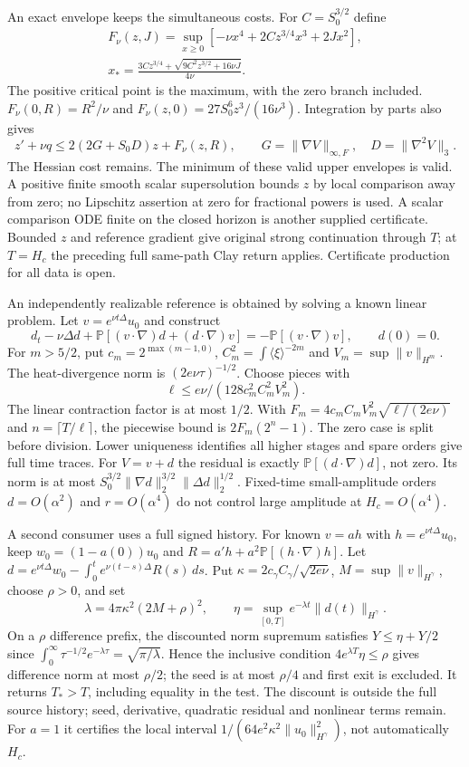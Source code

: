\documentclass[11pt]{article}
\begin{document}
An exact envelope keeps the simultaneous costs. For $C=S_0^{3/2}$ define
\[
 \begin{gathered}
 F_\nu(z,J)=\sup_{x\ge0}[-\nu x^4+2Cz^{3/4}x^3+2Jx^2],\\
 x_* =\frac{3Cz^{3/4}+\sqrt{9C^2z^{3/2}+16\nu J}}{4\nu}.
 \end{gathered}
\]
The positive critical point is the maximum, with the zero branch included.
$F_\nu(0,R)=R^2/\nu$ and
$F_\nu(z,0)=27S_0^6z^3/(16\nu^3)$. Integration by parts also gives
\[
 z'+\nu q\le2(2G+S_0D)z+F_\nu(z,R),\qquad
 G=\|\nabla V\|_{\infty,F},\quad D=\|\nabla^2V\|_3.
\]
The Hessian cost remains. The minimum of these valid upper envelopes is
valid. A positive finite smooth scalar supersolution bounds $z$ by local
comparison away from zero; no Lipschitz assertion at zero for fractional
powers is used. A scalar comparison ODE finite on the closed horizon is
another supplied certificate. Bounded $z$ and reference gradient give
original strong continuation through $T$; at $T=H_c$ the preceding full
same-path Clay return applies. Certificate production for all data is open.

An independently realizable reference is obtained by solving a known
linear problem. Let $v=e^{\nu t\Delta}u_0$ and construct
\[
 d_t-\nu\Delta d+\mathbb P[(v\cdot\nabla)d+(d\cdot\nabla)v]
      =-\mathbb P[(v\cdot\nabla)v],\qquad d(0)=0.
\]
For $m>5/2$, put $c_m=2^{\max(m-1,0)}$,
$C_m^2=\int\langle\xi\rangle^{-2m}$ and
$V_m=\sup\|v\|_{H^m}$. The heat-divergence norm is
$(2e\nu\tau)^{-1/2}$. Choose pieces with
\[
 \ell\le e\nu/(128c_m^2C_m^2V_m^2).
\]
The linear contraction factor is at most $1/2$.
With $F_m=4c_mC_mV_m^2\sqrt{\ell/(2e\nu)}$ and
$n=\lceil T/\ell\rceil$, the piecewise bound is $2F_m(2^n-1)$.
The zero case is split before division. Lower uniqueness identifies all
higher stages and spare orders give full time traces. For $V=v+d$ the
residual is exactly $\mathbb P[(d\cdot\nabla)d]$, not zero. Its norm
is at most $S_0^{3/2}\|\nabla d\|_2^{3/2}\|\Delta d\|_2^{1/2}$.
Fixed-time small-amplitude orders $d=O(\alpha^2)$ and $r=O(\alpha^4)$
do not control large amplitude at $H_c=O(\alpha^4)$.

A second consumer uses a full signed history. For known $v=ah$ with
$h=e^{\nu t\Delta}u_0$, keep $w_0=(1-a(0))u_0$ and
$R=a'h+a^2\mathbb P[(h\cdot\nabla)h]$. Let
$d=e^{\nu t\Delta}w_0-\int_0^t e^{\nu(t-s)\Delta}R(s)\,ds$.
Put $\kappa=2c_\gamma C_\gamma/\sqrt{2e\nu}$,
$M=\sup\|v\|_{H^\gamma}$, choose $\rho>0$, and set
\[
 \lambda=4\pi\kappa^2(2M+\rho)^2,\qquad
 \eta=\sup_{[0,T]} e^{-\lambda t}\|d(t)\|_{H^\gamma}.
\]
On a $\rho$ difference prefix, the discounted norm supremum satisfies
$Y\le\eta+Y/2$ since $\int_0^\infty\tau^{-1/2}e^{-\lambda\tau}
=\sqrt{\pi/\lambda}$. Hence the inclusive condition
$4e^{\lambda T}\eta\le\rho$ gives difference norm at most $\rho/2$;
the seed is at most $\rho/4$ and first exit is excluded. It returns
$T_*>T$, including equality in the test. The discount is outside the full
source history; seed, derivative, quadratic residual and nonlinear terms
remain. For $a=1$ it certifies the local interval
$1/(64e^2\kappa^2\|u_0\|_{H^\gamma}^2)$, not automatically $H_c$.
\end{document}
